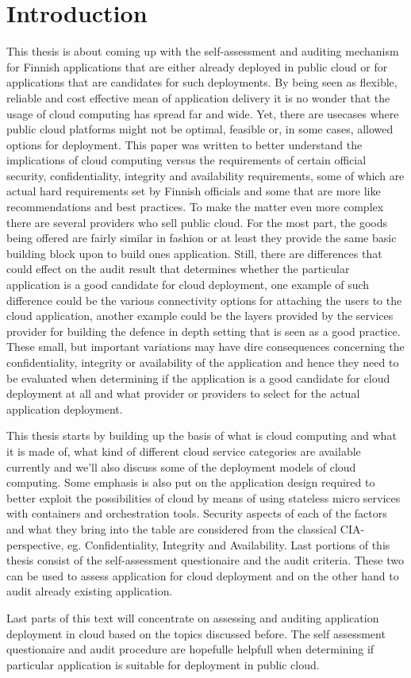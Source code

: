 \documentclass{article}
\begin{document}
\section{Introduction}
This thesis is about coming up with the self-assessment and auditing mechanism for Finnish applications that are either already deployed in public cloud or for applications that are candidates for such deployments. By being seen as flexible, reliable and cost effective mean of application delivery it is no wonder that the usage of cloud computing has spread far and wide.
Yet, there are usecases where public cloud platforms might not be optimal, feasible or, in some cases, allowed options for deployment. This paper was written to better understand the implications of cloud computing versus the requirements of certain official security, confidentiality, integrity and availability requirements, some of which are actual hard requirements set by Finnish officials and some that are more like recommendations and best practices. To make the matter even more complex there are several providers who sell public cloud. For the most part, the goods being offered are fairly similar in fashion or at least they provide the same basic building block upon to build ones application. Still, there are differences that could effect on the audit result that determines whether the particular application is a good candidate for cloud deployment, one example of such difference could be the various connectivity options for attaching the users to the cloud application, another example could be the layers provided by the services provider for building the defence in depth setting that is seen as a good practice. These small, but important variations may have dire consequences concerning the confidentiality, integrity or availability of the application and hence they need to be evaluated when determining if the application is a good candidate for cloud deployment at all and what provider or providers to select for the actual application deployment.
\par
This thesis starts by building up the basis of what is cloud computing and what it is made of, what kind of different cloud service categories are available currently and we'll also discuss some of the deployment models of cloud computing. Some emphasis is also put on the application design required to better exploit the possibilities of cloud by means of using stateless micro services with containers and orchestration tools. Security aspects of each of the factors and what they bring into the table are considered from the classical CIA-perspective, eg. Confidentiality, Integrity and Availability. Last portions of this thesis consist of the self-assessment questionaire and the audit criteria. These two can be used to assess application for cloud deployment and on the other hand to audit already existing application.
\par
Last parts of this text will concentrate on assessing and auditing application deployment in cloud based on the topics discussed before. The self assessment questionaire and audit procedure are hopefulle helpfull when determining if particular application is suitable for deployment in public cloud.
\end{document}
